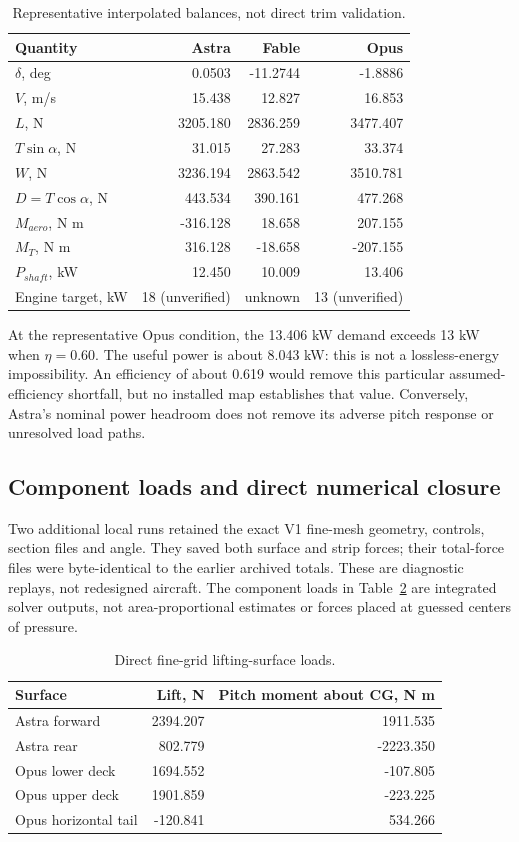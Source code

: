 \documentclass[11pt,a4paper]{article}
\begin{document}
\begin{table}[H]\centering\small
\caption{Representative interpolated balances, not direct trim validation.}\label{tab:interpolated}
\begin{tabular}{lrrr}\toprule
Quantity & Astra & Fable & Opus\\\midrule
$\delta$, deg &0.0503&-11.2744&-1.8886\\
$V$, m/s &15.438&12.827&16.853\\
$L$, N &3205.180&2836.259&3477.407\\
$T\sin\alpha$, N &31.015&27.283&33.374\\
$W$, N &3236.194&2863.542&3510.781\\
$D=T\cos\alpha$, N &443.534&390.161&477.268\\
$M_{aero}$, N m &-316.128&18.658&207.155\\
$M_T$, N m &316.128&-18.658&-207.155\\
$P_{shaft}$, kW &12.450&10.009&13.406\\
Engine target, kW &18 (unverified)&unknown&13 (unverified)\\\bottomrule
\end{tabular}
\end{table}

At the representative Opus condition, the 13.406 kW demand exceeds 13 kW when $\eta=0.60$. The useful power is about 8.043 kW: this is not a lossless-energy impossibility. An efficiency of about 0.619 would remove this particular assumed-efficiency shortfall, but no installed map establishes that value. Conversely, Astra's nominal power headroom does not remove its adverse pitch response or unresolved load paths.

\subsection{Component loads and direct numerical closure}
Two additional local runs retained the exact V1 fine-mesh geometry, controls, section files and angle. They saved both surface and strip forces; their total-force files were byte-identical to the earlier archived totals. These are diagnostic replays, not redesigned aircraft. The component loads in Table~\ref{tab:loads} are integrated solver outputs, not area-proportional estimates or forces placed at guessed centers of pressure.

\begin{table}[H]\centering\small
\caption{Direct fine-grid lifting-surface loads.}\label{tab:loads}
\begin{tabular}{lrr}\toprule
Surface & Lift, N & Pitch moment about CG, N m\\\midrule
Astra forward &2394.207&1911.535\\
Astra rear &802.779&-2223.350\\
Opus lower deck &1694.552&-107.805\\
Opus upper deck &1901.859&-223.225\\
Opus horizontal tail &-120.841&534.266\\\bottomrule
\end{tabular}
\end{table}
\end{document}
